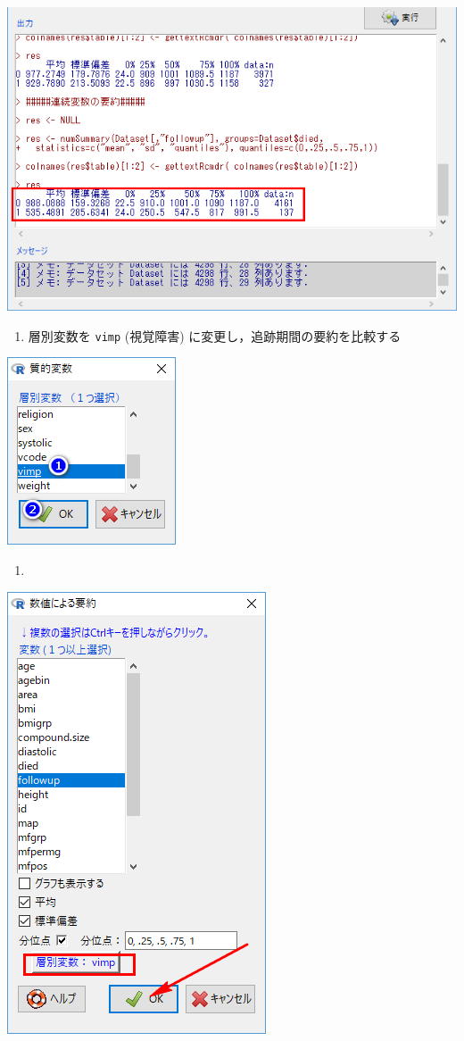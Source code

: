 \documentclass[11pt,]{problemset}
\providecommand{\tightlist}{%
  \setlength{\itemsep}{0pt}\setlength{\parskip}{0pt}}
\begin{document}
\begin{center}\includegraphics[width=0.55\linewidth,height=0.35\textheight]{pic/survival06} \end{center}

\newpage

\begin{enumerate}
\def\labelenumi{\arabic{enumi}.}
\setcounter{enumi}{7}
\tightlist
\item
  層別変数を \texttt{vimp} (視覚障害) に変更し，追跡期間の要約を比較する
\end{enumerate}

\begin{center}\includegraphics[width=0.25\linewidth,height=0.35\textheight]{pic/survival0901} \end{center}

\begin{enumerate}
\def\labelenumi{\arabic{enumi}.}
\setcounter{enumi}{8}
\item
\end{enumerate}

\begin{center}\includegraphics[width=0.45\linewidth,height=0.35\textheight]{pic/survival0902} \end{center}
\end{document}
